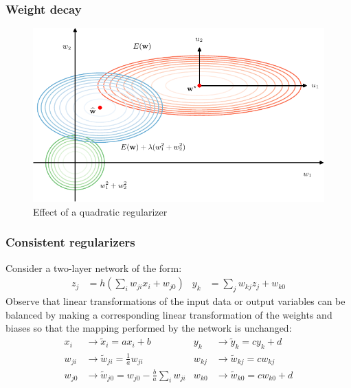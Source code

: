 \documentclass{beamer}
\begin{document}
\begin{frame}
    \frametitle{Weight decay}
    \begin{figure}
        \caption{Effect of a quadratic regularizer}
        \includegraphics[height=0.7\textheight]{Figure_3.pdf}
    \end{figure}
\end{frame}

\begin{frame}
    \frametitle{Consistent regularizers}
    Consider a two-layer network of the form:
    \begin{align*}
        z_{j}&=h(\sum_{i}w_{ji}x_{i}+w_{j0})&y_{k}&=\sum_{j}w_{kj}z_{j}+w_{k0}
    \end{align*}
    Observe that linear transformations of the input data or output variables can be balanced by making a corresponding linear transformation of the weights and biases so that the mapping performed by the network is unchanged:
    \begin{align*}
        x_{i}&\to\tilde{x}_{i}=ax_{i}+b&y_{k}&\to\tilde{y}_{k}=cy_{k}+d \\
        w_{ji}&\to\tilde{w}_{ji}=\frac{1}{a}w_{ji}&w_{kj}&\to\tilde{w}_{kj}=cw_{kj} \\
        w_{j0}&\to\tilde{w}_{j0}=w_{j0}-\frac{b}{a}\sum_{i}w_{ji}&w_{k0}&\to\tilde{w}_{k0}=cw_{k0}+d
    \end{align*}
\end{frame}
\end{document}
